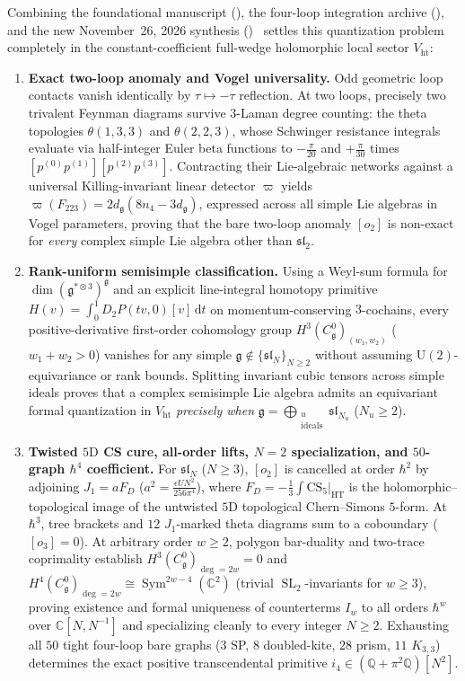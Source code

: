 \documentclass[11pt,letterpaper]{article}
\numberwithin{equation}{section}
\theoremstyle{plain}
\theoremstyle{definition}
\theoremstyle{remark}
\newcommand{\dd}{\mathrm{d}}
\newcommand{\fg}{\mathfrak{g}}
\newcommand{\fsl}{\mathfrak{sl}}
\newcommand{\Sym}{\operatorname{Sym}}
\newcommand{\SL}{\operatorname{SL}}
\newcommand{\Vht}{V_{\mathrm{ht}}}
\newcommand{\Cg}{C^0_{\fg}}
\begin{document}
Combining the foundational manuscript (), the four-loop integration archive (), and the new November~26, 2026 synthesis ()~\cite{RepoAllOrders} settles this quantization problem completely in the constant-coefficient full-wedge holomorphic local sector $\Vht$:
\begin{enumerate}[leftmargin=*]
  \item \textbf{Exact two-loop anomaly and Vogel universality.} Odd geometric loop contacts vanish identically by $\tau \mapsto -\tau$ reflection. At two loops, precisely two trivalent Feynman diagrams survive $3$-Laman degree counting: the theta topologies $\theta(1,3,3)$ and $\theta(2,2,3)$, whose Schwinger resistance integrals evaluate via half-integer Euler beta functions to $-\frac{\pi}{20}$ and $+\frac{\pi}{30}$ times $[p^{(0)}p^{(1)}][p^{(2)}p^{(3)}]$. Contracting their Lie-algebraic networks against a universal Killing-invariant linear detector $\varpi$ yields $\varpi(F_{223}) = 2d_{\fg}(8n_4 - 3d_{\fg})$, expressed across all simple Lie algebras in Vogel parameters, proving that the bare two-loop anomaly $[o_2]$ is non-exact for \emph{every} complex simple Lie algebra other than $\fsl_2$.
  \item \textbf{Rank-uniform semisimple classification.} Using a Weyl-sum formula for $\dim(\fg^{*\otimes 3})^{\fg}$ and an explicit line-integral homotopy primitive $H(v) = \int_0^1 D_2 P(tv,0)[v]\,\dd t$ on momentum-conserving $3$-cochains, every positive-derivative first-order cohomology group $H^3(\Cg)_{(w_1,w_2)}$ ($w_1+w_2 > 0$) vanishes for any simple $\fg \notin \{\fsl_N\}_{N\ge 2}$ without assuming $\mathrm{U}(2)$-equivariance or rank bounds. Splitting invariant cubic tensors across simple ideals proves that a complex semisimple Lie algebra admits an equivariant formal quantization in $\Vht$ \emph{precisely when} $\fg = \bigoplus_{\substack{u\\\mathrm{ideals}}}\fsl_{N_u}$ ($N_u \ge 2$).
  \item \textbf{Twisted $5\mathrm{D}$ CS cure, all-order lifts, $N=2$ specialization, and $50$-graph $\hbar^4$ coefficient.} For $\fsl_N$ ($N \ge 3$), $[o_2]$ is cancelled at order $\hbar^2$ by adjoining $J_1 = a F_D$ ($a^2 = \frac{\epsilon U N^2}{256\pi^4}$), where $F_D = -\frac{1}{3}\int\mathrm{CS}_5|_{\mathrm{HT}}$ is the holomorphic--topological image of the untwisted $5\mathrm{D}$ topological Chern--Simons $5$-form. At $\hbar^3$, tree brackets and $12$ $J_1$-marked theta diagrams sum to a coboundary ($[o_3]=0$). At arbitrary order $w \ge 2$, polygon bar-duality and two-trace coprimality establish $H^3(\Cg)_{\deg=2w}=0$ and $H^4(\Cg)_{\deg=2w} \cong \Sym^{2w-4}(\mathbb{C}^2)$ (trivial $\SL_2$-invariants for $w \ge 3$), proving existence and formal uniqueness of counterterms $I_w$ to all orders $\hbar^w$ over $\mathbb{C}[N,N^{-1}]$ and specializing cleanly to every integer $N \ge 2$. Exhausting all $50$ tight four-loop bare graphs ($3$ SP, $8$ doubled-kite, $28$ prism, $11$ $K_{3,3}$) determines the exact positive transcendental primitive $i_4 \in (\mathbb{Q} + \pi^2\mathbb{Q})[N^2]$.

\end{enumerate}
\end{document}
